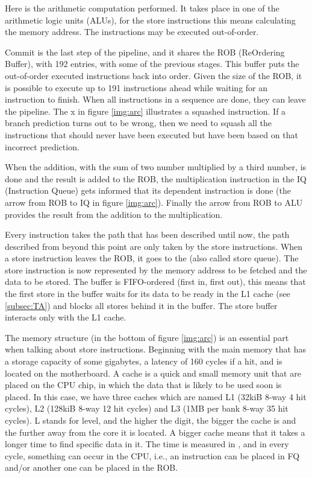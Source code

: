 Here is the arithmetic computation performed. It takes place in one of the arithmetic logic units (ALUs), for the store instructions this means calculating the memory address. The instructions may be executed out-of-order. 

Commit is the last step of the pipeline, and it shares the ROB (ReOrdering Buffer),
with 192 entries, with some of the previous stages. This buffer puts the out-of-order executed instructions back into
order. Given the size of the ROB, it is possible to execute up to 191 instructions ahead while waiting for an instruction to finish. When 
 all instructions in a sequence are done, they can leave the pipeline. The {\color{red}x} in figure
\ref{img:arc} illustrates a squashed instruction. If a branch prediction turns out to be wrong,
then we need to squash all the instructions that should never have been executed but
have been based on that incorrect prediction.

 When the addition, with the sum of two number multiplied by a third number, is
 done and the result is added to the ROB, the multiplication instruction in the IQ
(Instruction Queue) gets informed that its dependent instruction is done (the arrow
from ROB to IQ in figure \ref{img:arc}). Finally the arrow from ROB to ALU provides the
result from the addition to the multiplication.

 Every instruction takes the path that has been described until now, the path described from beyond this point are only taken by the store instructions. When a store instruction leaves the ROB, it goes to the  (also called store queue). The store instruction is now represented by the memory address to be fetched and the data to be stored. The buffer is FIFO-ordered (first in, first out), this means that the first store in the buffer waits for its data to be ready in the L1 cache (see \ref{subsec:TA}) and blocks all stores behind it in the buffer. The store buffer interacts only with the L1 cache.

The memory structure (in the bottom of figure \ref{img:arc}) is an essential part when talking about store instructions. Beginning with the main memory that has a storage capacity of some gigabytes, a latency of 160 cycles if a hit, and is located on the motherboard. A cache is a quick and small memory unit that are placed on the CPU chip, in which the data that is likely to be used soon is placed. In this case, we have three caches which are named L1 (32kiB 8-way 4 hit cycles), L2 (128kiB 8-way 12 hit cycles) and L3 (1MB per bank 8-way 35 hit cycles). L stands for level, and the higher the digit, the bigger the cache is and the further away from the core it is located. A bigger cache means that it takes a longer time to find specific data in it. The time is measured in , and in every cycle, something can occur in the CPU, i.e., an instruction can be placed in FQ and/or another one can be placed in the ROB. 

